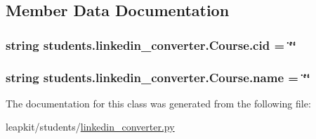 \subsection{Member Data Documentation}
\hypertarget{classstudents_1_1linkedin__converter_1_1_course_a61b6dbcb8128298f44fafc413667c418}{
\subsubsection[{cid}]{\setlength{\rightskip}{0pt plus 5cm}string students.\-linkedin\-\_\-converter.\-Course.\-cid = \char`\"{}\char`\"{}\hspace{0.3cm}{\ttfamily [static]}}}\label{classstudents_1_1linkedin__converter_1_1_course_a61b6dbcb8128298f44fafc413667c418}
\hypertarget{classstudents_1_1linkedin__converter_1_1_course_a086c26e2a7267f59ebf1ed12aa03344c}{
\subsubsection[{name}]{\setlength{\rightskip}{0pt plus 5cm}string students.\-linkedin\-\_\-converter.\-Course.\-name = \char`\"{}\char`\"{}\hspace{0.3cm}{\ttfamily [static]}}}\label{classstudents_1_1linkedin__converter_1_1_course_a086c26e2a7267f59ebf1ed12aa03344c}


The documentation for this class was generated from the following file\-:\begin{DoxyCompactItemize}
\item 
leapkit/students/\hyperlink{linkedin__converter_8py}{linkedin\-\_\-converter.\-py}\end{DoxyCompactItemize}
